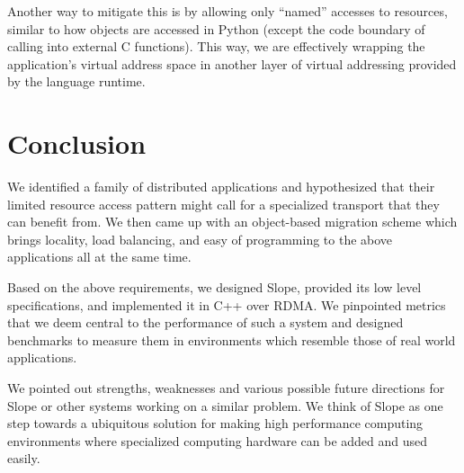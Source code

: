 Another way to mitigate this is by allowing only ``named'' accesses to
resources, similar to how objects are accessed in Python (except the code
boundary of calling into external C functions). This way, we are effectively
wrapping the application's
virtual address space in another layer of virtual addressing provided by the
language runtime.



\section{Conclusion}

We identified a family of distributed applications and hypothesized that
their limited resource access pattern might call for a specialized transport
that they can benefit from. We then came up with an object-based migration
scheme which brings locality, load balancing, and easy of programming to the
above applications all at the same time.

Based on the above requirements, we designed Slope, provided its low level
specifications, and implemented it in C++ over RDMA. We pinpointed metrics that
we deem central to the performance of such a system and designed benchmarks to
measure them in environments which resemble those of real world applications.

We pointed out strengths, weaknesses and various possible future directions for
Slope or other systems working on a similar problem. We think of Slope as one
step towards a ubiquitous solution for making high performance computing
environments where specialized computing hardware can be added and used easily.

